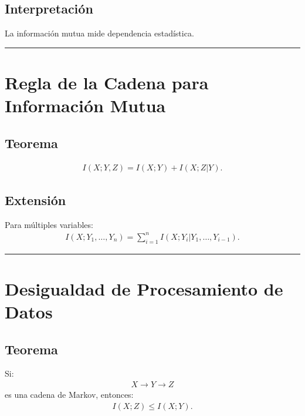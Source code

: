 \documentclass[letterpaper,10pt,english]{jupyterBook}
\begin{document}
\subsection{Interpretación}
\label{\detokenize{02_mathematical_foundations/properties_theorems:interpretacion}}
\sphinxAtStartPar
La información mutua mide dependencia estadística.


\bigskip\hrule\bigskip



\section{Regla de la Cadena para Información Mutua}
\label{\detokenize{02_mathematical_foundations/properties_theorems:regla-de-la-cadena-para-informacion-mutua}}

\subsection{Teorema}
\label{\detokenize{02_mathematical_foundations/properties_theorems:id10}}\begin{equation*}
\begin{split}
I(X;Y,Z)=I(X;Y)+I(X;Z|Y).
\end{split}
\end{equation*}

\subsection{Extensión}
\label{\detokenize{02_mathematical_foundations/properties_theorems:extension}}
\sphinxAtStartPar
Para múltiples variables:
\begin{equation*}
\begin{split}
I(X;Y_1,\dots,Y_n)=
\sum_{i=1}^{n}
I(X;Y_i|Y_1,\dots,Y_{i-1}).
\end{split}
\end{equation*}

\bigskip\hrule\bigskip



\section{Desigualdad de Procesamiento de Datos}
\label{\detokenize{02_mathematical_foundations/properties_theorems:desigualdad-de-procesamiento-de-datos}}

\subsection{Teorema}
\label{\detokenize{02_mathematical_foundations/properties_theorems:id11}}
\sphinxAtStartPar
Si:
\begin{equation*}
\begin{split}
X\rightarrow Y\rightarrow Z
\end{split}
\end{equation*}
\sphinxAtStartPar
es una cadena de Markov, entonces:
\begin{equation*}
\begin{split}
I(X;Z)\le I(X;Y).
\end{split}
\end{equation*}
\end{document}

